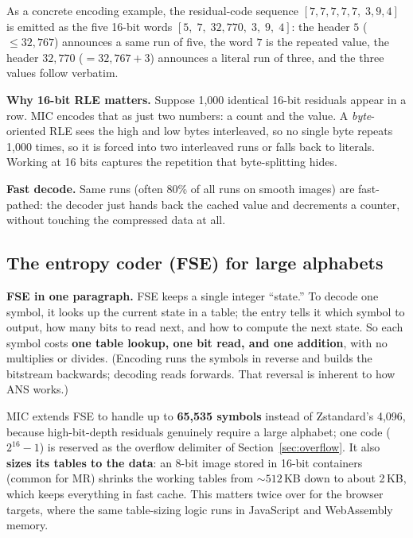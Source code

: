 \documentclass[journal]{IEEEtran}
\begin{document}
As a concrete encoding example, the residual-code sequence
$[7,7,7,7,7,\;3,9,4]$ is emitted as the five 16-bit words
$[5,\;7,\;32{,}770,\;3,\;9,\;4]$: the header $5$ ($\leq 32{,}767$) announces
a same run of five, the word $7$ is the repeated value, the header
$32{,}770$ ($= 32{,}767 + 3$) announces a literal run of three, and the
three values follow verbatim.

\textbf{Why 16-bit RLE matters.} Suppose 1,000 identical 16-bit residuals
appear in a row. MIC encodes that as just two numbers: a count and the value.
A \emph{byte}-oriented RLE sees the high and low bytes interleaved, so no
single byte repeats 1,000 times, so it is forced into two interleaved runs or
falls back to literals. Working at 16 bits captures the repetition that
byte-splitting hides.

\textbf{Fast decode.} Same runs (often 80\% of all runs on smooth images) are
fast-pathed: the decoder just hands back the cached value and decrements a
counter, without touching the compressed data at all.

\subsection{The entropy coder (FSE) for large alphabets}
\label{sec:fse}

\textbf{FSE in one paragraph.} FSE keeps a single integer ``state.'' To
decode one symbol, it looks up the current state in a table; the entry tells
it which symbol to output, how many bits to read next, and how to compute the
next state. So each symbol costs \textbf{one table lookup, one bit read, and
one addition}, with no multiplies or divides. (Encoding runs the symbols in
reverse and builds the bitstream backwards; decoding reads forwards. That
reversal is inherent to how ANS works.)

MIC extends FSE to handle up to \textbf{65,535 symbols} instead of
Zstandard's 4,096, because high-bit-depth residuals genuinely require a large
alphabet; one code ($2^{16}-1$) is reserved as the overflow delimiter of
Section~\ref{sec:overflow}. It also \textbf{sizes its tables to the data}: an
8-bit image stored in 16-bit containers (common for MR) shrinks the working
tables from ${\sim}512$\,KB down to about 2\,KB, which keeps everything in
fast cache. This matters twice over for the browser targets, where the same
table-sizing logic runs in JavaScript and WebAssembly memory.
\end{document}
